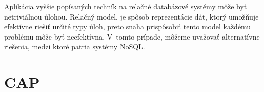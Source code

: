 \documentclass[11pt,twoside,a4paper]{book}
\begin{document}
Aplikácia vyššie popísaných techník na relačné databázové systémy môže byť netriviálnou úlohou. Relačný model, je spôsob reprezentácie dát, ktorý umožňuje efektívne riešiť určité typy úloh, preto snaha prispôsobiť tento model každému problému môže byť neefektívna. V~tomto prípade, môžeme uvažovať alternatívne riešenia, medzi ktoré patria systémy NoSQL.





% 



\section{CAP}
\label{section:CAP}

\end{document}
